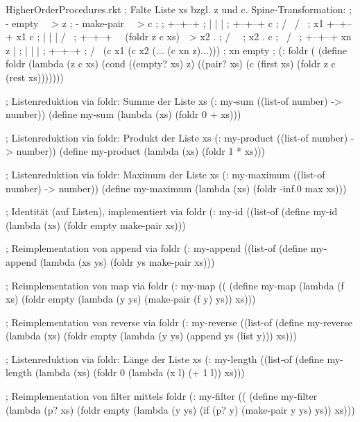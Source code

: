 \begin{filecontents*}{HigherOrderProcedures.rkt}
; Falte Liste xs bzgl. z und c.  Spine-Transformation:
; - empty     ~~> z
; - make-pair ~~> c
;
;   +--+--+                             
;   |  |  |                             
;   +--+--+                                 c
;   /     \                                / \ 
; x1      +--+--+                        x1   c
;         |  |  |                            / \  
;         +--+--+   ~~(foldr z c xs)~~>    x2   .
;         /     \                                \
;       x2       .                                c
;                 \                              / \  
;                 +--+--+                      xn   z                   |
;                 |  |  |                         
;                 +--+--+                           
;                 /     \             (c x1 (c x2 (... (c xn z)...)))  
;                xn     empty                        
;
(: foldr (%
(define foldr
  (lambda (z c xs)
    (cond ((empty? xs) z)
          ((pair? xs)  (c (first xs) (foldr z c (rest xs)))))))
 

; Listenreduktion via foldr: Summe der Liste xs
(: my-sum ((list-of number) -> number))
(define my-sum
  (lambda (xs)
    (foldr 0 + xs)))

; Listenreduktion via foldr: Produkt der Liste xs
(: my-product ((list-of number) -> number))
(define my-product
  (lambda (xs)
    (foldr 1 * xs)))

; Listenreduktion via foldr: Maximum der Liste xs
(: my-maximum ((list-of number) -> number))
(define my-maximum
  (lambda (xs)
    (foldr -inf.0 max xs)))

; Identität (auf Listen), implementiert via foldr
(: my-id ((list-of %
(define my-id
  (lambda (xs)
    (foldr empty make-pair xs)))
    
; Reimplementation von append via foldr
(: my-append ((list-of %
(define my-append
  (lambda (xs ys)
    (foldr ys make-pair xs)))

; Reimplementation von map via foldr
(: my-map ((%
(define my-map
  (lambda (f xs)
    (foldr empty                                
           (lambda (y ys) (make-pair (f y) ys))  
           xs)))

; Reimplementation von reverse via foldr
(: my-reverse ((list-of %
(define my-reverse
  (lambda (xs)
    (foldr empty                                
           (lambda (y ys) (append ys (list y)))
           xs)))

; Listenreduktion via foldr: Länge der Liste xs
(: my-length ((list-of %
(define my-length
  (lambda (xs)
    (foldr 0 (lambda (x l) (+ 1 l)) xs)))

; Reimplementation von filter mittels foldr
(: my-filter ((%
(define my-filter
  (lambda (p? xs)
    (foldr empty 
           (lambda (y ys) (if (p? y)
                              (make-pair y ys)
                              ys)) 
           xs)))




\end{filecontents*}